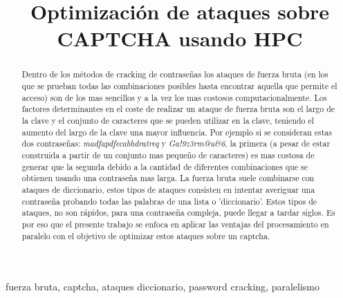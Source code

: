 \documentclass[conference]{IEEEtran}
\begin{document}
\title{Optimización de ataques sobre CAPTCHA usando HPC\\
}

\author{
\and
{}
}

\maketitle

\begin{abstract}
Dentro de los métodos de cracking de contraseñas los ataques de fuerza bruta (en los que se prueban todas las combinaciones posibles hasta encontrar aquella que permite el acceso) son de los mas sencillos y a la vez los mas costosos computacionalmente. 
Los factores determinantes en el coste de realizar un ataque de fuerza bruta son el largo de la clave y el conjunto de caracteres que se pueden utilizar en la clave, teniendo el aumento del largo de la clave una mayor influencia. Por ejemplo si se consideran estas dos contraseñas: \textit{madfapdfecabhdratreq} y \textit{Ga!9z3rm@u\&6}, la primera (a pesar de estar construida a partir de un conjunto mas pequeño de caracteres) es mas costosa de generar que la segunda debido a la cantidad de diferentes combinaciones que se obtienen usando una contraseña mas larga. La fuerza bruta suele combinarse con ataques de diccionario, estos tipos de ataques consisten en intentar averiguar una contraseña probando todas las palabras de una lista o 'diccionario'. Estos tipos de ataques, no son rápidos, para una contraseña compleja, puede llegar a tardar siglos. Es por eso que el presente trabajo se enfoca en aplicar las ventajas del procesamiento en paralelo con el objetivo de optimizar estos ataques sobre un captcha.
\newline
\end{abstract}

\begin{IEEEkeywords}
fuerza bruta, captcha, ataques diccionario, password cracking, paralelismo
\end{IEEEkeywords}
\end{document}
